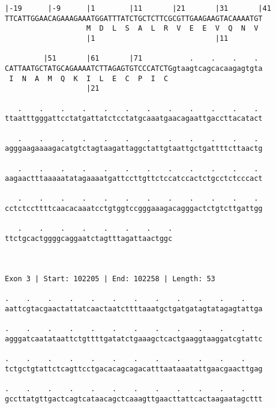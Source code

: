 \documentclass{article}
\begin{document}
\begin{Verbatim}
|-19      |-9      |1        |11       |21       |31       |41
TTCATTGGAACAGAAAGAAATGGATTTATCTGCTCTTCGCGTTGAAGAAGTACAAAATGT
                   M  D  L  S  A  L  R  V  E  E  V  Q  N  V 
                   |1                            |11        
  
         |51       |61       |71           .    .    .    . 
CATTAATGCTATGCAGAAAATCTTAGAGTGTCCCATCTGgtaagtcagcacaagagtgta
 I  N  A  M  Q  K  I  L  E  C  P  I  C                      
                   |21                                      
  
   .    .    .    .    .    .    .    .    .    .    .    . 
ttaatttgggattcctatgattatctcctatgcaaatgaacagaattgaccttacatact
                                                            
   .    .    .    .    .    .    .    .    .    .    .    . 
agggaagaaaagacatgtctagtaagattaggctattgtaattgctgattttcttaactg
                                                            
   .    .    .    .    .    .    .    .    .    .    .    . 
aagaactttaaaaatatagaaaatgattccttgttctccatccactctgcctctcccact
                                                            
   .    .    .    .    .    .    .    .    .    .    .    . 
cctctccttttcaacacaaatcctgtggtccgggaaagacagggactctgtcttgattgg
                                                            
   .    .    .    .    .    .    .    .
ttctgcactggggcaggaatctagtttagattaactggc
                                       
                                       
 
Exon 3 | Start: 102205 | End: 102258 | Length: 53
 
.    .    .    .    .    .    .    .    .    .    .    .    
aattcgtacgaactattatcaactaatcttttaaatgctgatgatagtatagagtattga
                                                            
.    .    .    .    .    .    .    .    .    .    .    .    
agggatcaatataattctgttttgatatctgaaagctcactgaaggtaaggatcgtattc
                                                            
.    .    .    .    .    .    .    .    .    .    .    .    
tctgctgtattctcagttcctgacacagcagacatttaataaatattgaacgaacttgag
                                                            
.    .    .    .    .    .    .    .    .    .    .    .    
gccttatgttgactcagtcataacagctcaaagttgaacttattcactaagaatagcttt
                                                            

\end{Verbatim}
\end{document}
